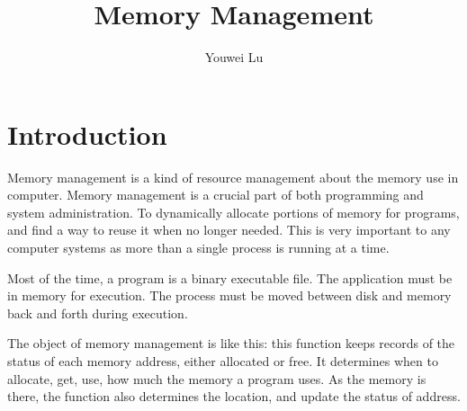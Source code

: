 \documentclass[doc,natbib,12pt]{apa6}
\title{Memory Management}
\author{Youwei Lu}
\affiliation{CISC 530-51- A-2018/Late Fall Assignment 1}
\begin{document}
	\maketitle
	
	\section{Introduction}
	
	Memory management is a kind of resource management about the memory use in computer. Memory management is a crucial part of both programming and system administration. To dynamically allocate portions of memory for programs, and find a way to reuse it when no longer needed. This is very important to any computer systems as more than a single process is running at a time. \citep{Gibson1988}
	
	Most of the time, a program is a binary executable file. The application must be in memory for execution. The process must be moved between disk and memory back and forth during execution.
	
	The object of memory management is like this: this function keeps records of the status of each memory address, either allocated or free. It determines when to allocate, get, use, how much the memory a program uses. As the memory is there, the function also determines the location, and update the status of address. \citep{Madnick1974}
	
\end{document}
